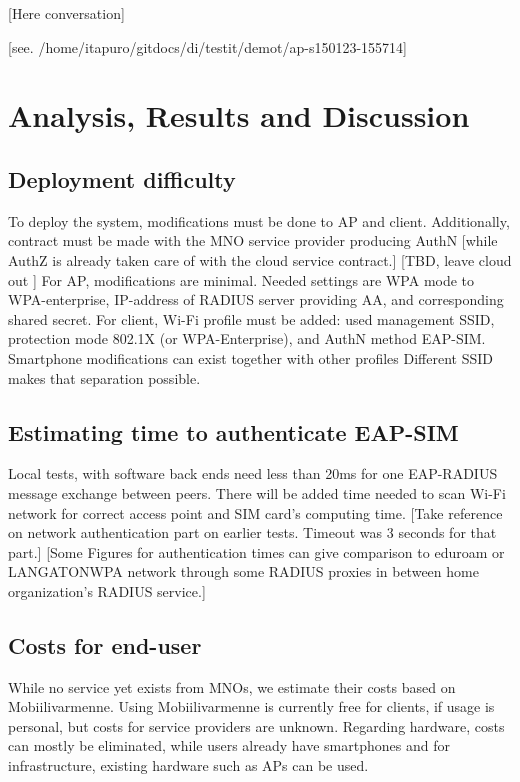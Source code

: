 \documentclass[12pt,a4paper,english]{tutthesis}
\begin{document}
[Here conversation]



[see. /home/itapuro/gitdocs/di/testit/demot/ap-s150123-155714]


\chapter{Analysis, Results and Discussion}
\label{sec-6}



\section{Deployment difficulty}
\label{sec-6-1}

To deploy the system, modifications must be done to AP and client.
Additionally, contract must be made with the MNO service
provider producing AuthN [while AuthZ is already taken care of with
the cloud service contract.]  [TBD, leave cloud out ]
For AP, modifications are minimal. Needed settings are
WPA mode to WPA-enterprise, IP-address of RADIUS server providing 
AA, and corresponding shared secret.
For client, Wi-Fi profile must be added: used management SSID,
protection mode 802.1X (or WPA-Enterprise), and AuthN method EAP-SIM.
Smartphone modifications can exist together with other
profiles  Different SSID makes that separation possible.

\section{Estimating time to authenticate EAP-SIM}
\label{sec-6-2}
Local tests, with software back ends need less than 20ms for one EAP-RADIUS message
exchange between peers. There will be added time needed to scan Wi-Fi
network for correct access point and SIM card's computing
time.
 [Take reference on network authentication part on earlier
tests. Timeout was 3 seconds for that part.]
[Some Figures for authentication times can give comparison to eduroam
or LANGATONWPA network through some RADIUS proxies in between home
organization's RADIUS service.]

\section{Costs for end-user}
\label{sec-6-3}
While no service yet exists from MNOs, we estimate their costs based on
Mobiilivarmenne. Using Mobiilivarmenne 
is currently free for clients, if usage is personal, but costs
for service providers are unknown. 
Regarding hardware, costs can mostly be eliminated, while users
already have smartphones and for infrastructure, existing hardware
such as APs can be used.
\end{document}
